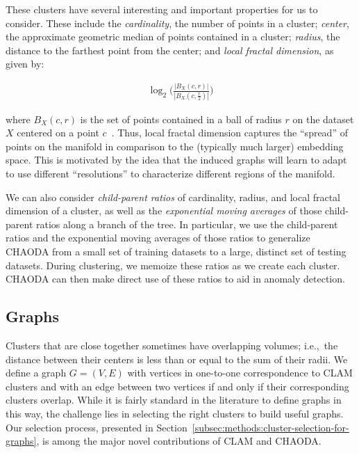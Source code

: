 These clusters have several interesting and important properties for us to consider.
These include the \textit{cardinality}, the number of points in a cluster;
\textit{center}, the approximate geometric median of points contained in a cluster;
\textit{radius}, the distance to the farthest point from the center;
and \textit{local fractal dimension},
as given by:

\begin{gather}
    \log_2\bigg(\frac{|B_X(c, r)|}{|B_X(c, \frac{r}{2})|}\bigg)
    \label{fractal-dimension}
\end{gather}

where $B_X(c,r)$ is the set of points contained in a ball of radius $r$ on the dataset $X$ centered on a point $c$~\cite{ishaq2019clustered}.
Thus, local fractal dimension captures the ``spread'' of points on the manifold in comparison to the (typically much larger) embedding space.
This is motivated by the idea that the induced graphs will learn to adapt to use different ``resolutions'' to characterize different regions of the manifold.

We can also consider \textit{child-parent ratios} of cardinality, radius, and local fractal dimension of a cluster, as well as the \textit{exponential moving averages} of those child-parent ratios along a branch of the tree.
In particular, we use the child-parent ratios and the exponential moving averages of those ratios to generalize CHAODA from a small set of training datasets to a large, distinct set of testing datasets.
During clustering, we memoize these ratios as we create each cluster.
CHAODA can then make direct use of these ratios to aid in anomaly detection.


\subsection{Graphs}
\label{subsec:methods:graphs}

Clusters that are close together sometimes have overlapping volumes; i.e.,\ the distance between their centers is less than or equal to the sum of their radii.
We define a graph $G=(V,E)$ with vertices in one-to-one correspondence to CLAM clusters and with an edge between two vertices if and only if their corresponding clusters overlap.
While it is fairly standard in the literature to define graphs in this way, the challenge lies in selecting the right clusters to build useful graphs.
Our selection process, presented in Section~\ref{subsec:methods:cluster-selection-for-graphs}, is among the major novel contributions of CLAM and CHAODA.

